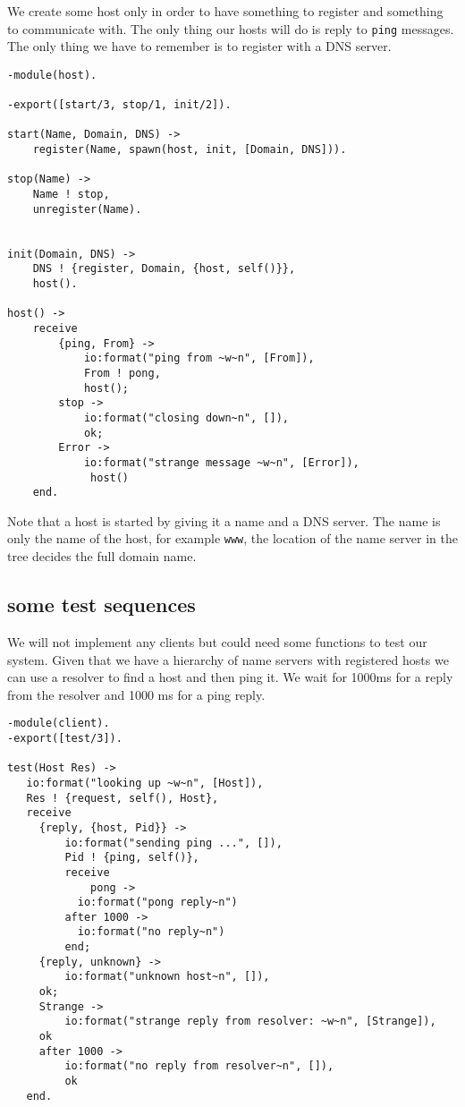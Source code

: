 \documentclass[a4paper, 11pt]{article}
\begin{document}
We create some host only in order to have something to register and
something to communicate with. The only thing our hosts will do is
reply to {\tt ping} messages. The only thing we have to remember is to
register with a DNS server.

\begin{verbatim}
-module(host).

-export([start/3, stop/1, init/2]).

start(Name, Domain, DNS) ->
    register(Name, spawn(host, init, [Domain, DNS])).

stop(Name) ->
    Name ! stop,
    unregister(Name).


init(Domain, DNS) ->
    DNS ! {register, Domain, {host, self()}},
    host().

host() ->
    receive
        {ping, From} ->
            io:format("ping from ~w~n", [From]),
            From ! pong,
            host();
        stop ->
            io:format("closing down~n", []),
            ok;
        Error ->
            io:format("strange message ~w~n", [Error]),
             host()
    end.
\end{verbatim}

Note that a host is started by giving it a name and a DNS server. The
name is only the name of the host, for example {\tt www}, the location
of the name server in the tree decides the full domain name.

\subsection{some test sequences}

We will not implement any clients but could need some functions to
test our system. Given that we have a hierarchy of name servers with
registered hosts we can use a resolver to find a host and then ping
it. We wait for 1000ms for a reply from the resolver and 1000 ms
for a ping reply.

\begin{verbatim}
-module(client).
-export([test/3]).

test(Host Res) ->
   io:format("looking up ~w~n", [Host]),
   Res ! {request, self(), Host},
   receive 
     {reply, {host, Pid}} ->
         io:format("sending ping ...", []),
         Pid ! {ping, self()},
         receive 
             pong ->
	       io:format("pong reply~n")
	     after 1000 ->
	       io:format("no reply~n")
         end;
     {reply, unknown} ->
         io:format("unknown host~n", []),
	 ok;
     Strange ->
         io:format("strange reply from resolver: ~w~n", [Strange]),
	 ok
     after 1000 ->
         io:format("no reply from resolver~n", []),
         ok
   end.
\end{verbatim}
\end{document}
